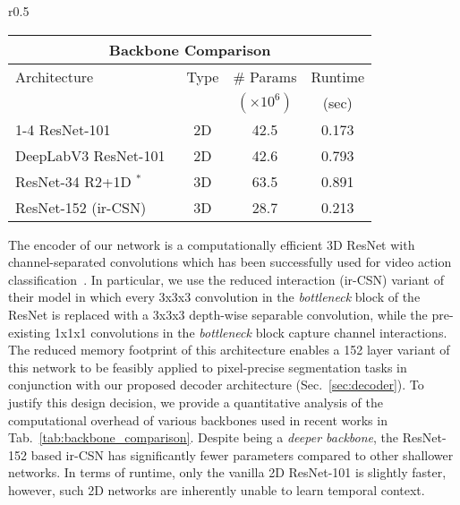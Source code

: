 \documentclass{bmvc2k}
\begin{document}
\begin{wraptable}{r}{0.5\textwidth}
\centering
\scriptsize
{}
\setlength{\tabcolsep}{5px}\vspace{-10pt}
\begin{tabular}{|l|c|c|c|}
\toprule
 \multicolumn{4}{c}{Backbone Comparison} \\
 \midrule
 Architecture & Type & \# Params            & Runtime \\
              &      & $\left(\times 10^6 \right)$ & (sec)     \\
\cmidrule(lr){1-4}
ResNet-101~\cite{He16CVPR}                     & 2D & 42.5 & 0.173 \\
DeepLabV3 ResNet-101~\cite{Chen17ARXIV}        & 2D & 42.6 & 0.793 \\
ResNet-34 R2+1D $^*$~\cite{Tran18CVPR} & 3D & 63.5 & 0.891 \\
ResNet-152 (ir-CSN)~\cite{Tran19ICCV}    & 3D & 28.7 & 0.213 \\
\bottomrule
\end{tabular}
\caption{Comparison of various backbones. Runtime is for generating feature maps for an 8-frame clip with $854\times 480$ resolution on an Nvidia GTX-1080Ti. $^*$: lower stride~\cite{Hou19BMVC}} 
\vspace{-2mm}
\label{tab:backbone_comparison}
\end{wraptable} 
The encoder of our network is a computationally efficient 3D ResNet with channel-separated convolutions which has been successfully used for video action classification~\cite{Tran19ICCV}. In particular, we use the reduced interaction (ir-CSN) variant of their model in which every 3x3x3 convolution in the \textit{bottleneck} block of the ResNet is replaced with a 3x3x3 depth-wise separable convolution, while the pre-existing 1x1x1 convolutions in the \textit{bottleneck} block capture channel interactions. The reduced memory footprint of this architecture enables a 152 layer variant of this network to be feasibly applied to pixel-precise segmentation tasks in conjunction with our proposed decoder architecture (Sec.~\ref{sec:decoder}). 
To justify this design decision, we provide a quantitative analysis of the computational overhead of various backbones used in recent works in Tab.~\ref{tab:backbone_comparison}. 
Despite being a \textit{deeper backbone}, the ResNet-152 based ir-CSN has significantly fewer parameters compared to other shallower networks. In terms of runtime, only the vanilla 2D ResNet-101 is slightly faster, however, such 2D networks are inherently unable to learn temporal context. 
\end{document}
